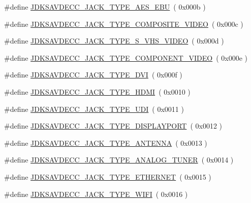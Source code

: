 \begin{DoxyCompactItemize}
\item 
\#define \hyperlink{group__jack__type_ga6e2edf5b42c747a7089b24914c17832e}{J\+D\+K\+S\+A\+V\+D\+E\+C\+C\+\_\+\+J\+A\+C\+K\+\_\+\+T\+Y\+P\+E\+\_\+\+A\+E\+S\+\_\+\+E\+BU}~( 0x000b )
\item 
\#define \hyperlink{group__jack__type_gaf95fea76081b8baf3b8e6e216cf270eb}{J\+D\+K\+S\+A\+V\+D\+E\+C\+C\+\_\+\+J\+A\+C\+K\+\_\+\+T\+Y\+P\+E\+\_\+\+C\+O\+M\+P\+O\+S\+I\+T\+E\+\_\+\+V\+I\+D\+EO}~( 0x000c )
\item 
\#define \hyperlink{group__jack__type_ga103fc5ded71c913d7fc360fdd1b3bd6b}{J\+D\+K\+S\+A\+V\+D\+E\+C\+C\+\_\+\+J\+A\+C\+K\+\_\+\+T\+Y\+P\+E\+\_\+\+S\+\_\+\+V\+H\+S\+\_\+\+V\+I\+D\+EO}~( 0x000d )
\item 
\#define \hyperlink{group__jack__type_ga1b0849b2f95ce942f3ed0d291020d37a}{J\+D\+K\+S\+A\+V\+D\+E\+C\+C\+\_\+\+J\+A\+C\+K\+\_\+\+T\+Y\+P\+E\+\_\+\+C\+O\+M\+P\+O\+N\+E\+N\+T\+\_\+\+V\+I\+D\+EO}~( 0x000e )
\item 
\#define \hyperlink{group__jack__type_gae03078268dc719868db16cfc22c6d63a}{J\+D\+K\+S\+A\+V\+D\+E\+C\+C\+\_\+\+J\+A\+C\+K\+\_\+\+T\+Y\+P\+E\+\_\+\+D\+VI}~( 0x000f )
\item 
\#define \hyperlink{group__jack__type_ga8e075f805cebba38faddfde87bb9a517}{J\+D\+K\+S\+A\+V\+D\+E\+C\+C\+\_\+\+J\+A\+C\+K\+\_\+\+T\+Y\+P\+E\+\_\+\+H\+D\+MI}~( 0x0010 )
\item 
\#define \hyperlink{group__jack__type_gafeb573bbd6b2657c0b9bbe5b8d9c43f6}{J\+D\+K\+S\+A\+V\+D\+E\+C\+C\+\_\+\+J\+A\+C\+K\+\_\+\+T\+Y\+P\+E\+\_\+\+U\+DI}~( 0x0011 )
\item 
\#define \hyperlink{group__jack__type_ga9e35ee31f4a9926aa3e65587900a7644}{J\+D\+K\+S\+A\+V\+D\+E\+C\+C\+\_\+\+J\+A\+C\+K\+\_\+\+T\+Y\+P\+E\+\_\+\+D\+I\+S\+P\+L\+A\+Y\+P\+O\+RT}~( 0x0012 )
\item 
\#define \hyperlink{group__jack__type_ga3cd5e74e4c9505002ab3b550e9a7db0f}{J\+D\+K\+S\+A\+V\+D\+E\+C\+C\+\_\+\+J\+A\+C\+K\+\_\+\+T\+Y\+P\+E\+\_\+\+A\+N\+T\+E\+N\+NA}~( 0x0013 )
\item 
\#define \hyperlink{group__jack__type_ga25861f200faeaf52c9306e1746721ae5}{J\+D\+K\+S\+A\+V\+D\+E\+C\+C\+\_\+\+J\+A\+C\+K\+\_\+\+T\+Y\+P\+E\+\_\+\+A\+N\+A\+L\+O\+G\+\_\+\+T\+U\+N\+ER}~( 0x0014 )
\item 
\#define \hyperlink{group__jack__type_ga9eb45eee4d85988218fac2b1191abb0e}{J\+D\+K\+S\+A\+V\+D\+E\+C\+C\+\_\+\+J\+A\+C\+K\+\_\+\+T\+Y\+P\+E\+\_\+\+E\+T\+H\+E\+R\+N\+ET}~( 0x0015 )
\item 
\#define \hyperlink{group__jack__type_gafa770c686813c451bb7f9979883a2790}{J\+D\+K\+S\+A\+V\+D\+E\+C\+C\+\_\+\+J\+A\+C\+K\+\_\+\+T\+Y\+P\+E\+\_\+\+W\+I\+FI}~( 0x0016 )

\end{DoxyCompactItemize}
